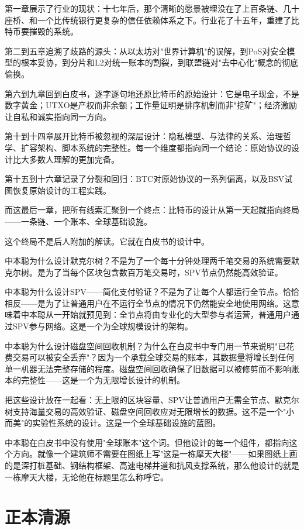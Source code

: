 \documentclass[a4paper,12pt,openany]{ctexbook}
\begin{document}
第一章展示了行业的现状：十七年后，那个清晰的愿景被埋没在了上百条链、几十座桥、和一个比传统银行更复杂的信任依赖体系之下。行业花了十五年，重建了比特币要摧毁的系统。

第二到五章追溯了歧路的源头：从以太坊对"世界计算机"的误解，到PoS对安全模型的根本妥协，到分片和L2对统一账本的割裂，到联盟链对"去中心化"概念的彻底偷换。

第六到九章回到白皮书，逐字逐句地还原比特币的原始设计：它是电子现金，不是数字黄金；UTXO是产权而非余额；工作量证明是排序机制而非"挖矿"；经济激励让自私和诚实指向同一方向。

第十到十四章展开比特币被忽视的深层设计：隐私模型、与法律的关系、治理哲学、扩容架构、脚本系统的完整性。每一个维度都指向同一个结论：原始协议的设计比大多数人理解的更加完备。

第十五到十六章记录了分裂和回归：BTC对原始协议的一系列偏离，以及BSV试图恢复原始设计的工程实践。

而这最后一章，把所有线索汇聚到一个终点：比特币的设计从第一天起就指向终局——一条链、一个账本、全球基础设施。

这个终局不是后人附加的解读。它就在白皮书的设计中。

中本聪为什么设计默克尔树？不是为了一个每十分钟处理两千笔交易的系统需要默克尔树。是为了当每个区块包含数百万笔交易时，SPV节点仍然能高效验证。

中本聪为什么设计SPV——简化支付验证？不是为了让每个人都运行全节点。恰恰相反——是为了让普通用户在不运行全节点的情况下仍然能安全地使用网络。这意味着中本聪从一开始就预见到：全节点将由专业化的大型参与者运营，普通用户通过SPV参与网络。这是一个为全球规模设计的架构。

中本聪为什么设计磁盘空间回收机制？为什么在白皮书中专门用一节来说明"已花费交易可以被安全丢弃"？因为一个承载全球交易的账本，其数据量将增长到任何单一机器无法完整存储的程度。磁盘空间回收确保了旧数据可以被修剪而不影响账本的完整性——这是一个为无限增长设计的机制。

把这些设计放在一起看：无上限的区块容量、SPV让普通用户无需全节点、默克尔树支持海量交易的高效验证、磁盘空间回收应对无限增长的数据。这不是一个"小而美"的实验性系统的设计。这是一个全球基础设施的蓝图。

中本聪在白皮书中没有使用"全球账本"这个词。但他设计的每一个组件，都指向这个方向。就像一个建筑师不需要在图纸上写"这是一栋摩天大楼"——如果图纸上画的是深打桩基础、钢结构框架、高速电梯井道和抗风支撑系统，那么他设计的就是一栋摩天大楼，无论他在标题里怎么称呼它。


\section*{正本清源}
\end{document}
